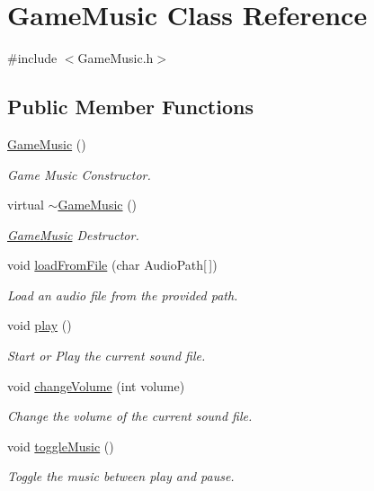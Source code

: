 \hypertarget{class_game_music}{}\section{Game\+Music Class Reference}
\label{class_game_music}


{\ttfamily \#include $<$Game\+Music.\+h$>$}

\subsection*{Public Member Functions}
\begin{DoxyCompactItemize}
\item 
\hyperlink{class_game_music_a3636a483e9a9d86ff5700f4a13662dcb}{Game\+Music} ()
\begin{DoxyCompactList}\small\item\em Game Music Constructor. \end{DoxyCompactList}\item 
virtual \hyperlink{class_game_music_a3ab16e5c895c854c7c1642e5718508f2}{$\sim$\+Game\+Music} ()
\begin{DoxyCompactList}\small\item\em \hyperlink{class_game_music}{Game\+Music} Destructor. \end{DoxyCompactList}\item 
void \hyperlink{class_game_music_a47a770430dc1213a4b31ab0353549018}{load\+From\+File} (char Audio\+Path\mbox{[}$\,$\mbox{]})
\begin{DoxyCompactList}\small\item\em Load an audio file from the provided path. \end{DoxyCompactList}\item 
void \hyperlink{class_game_music_a88151bbcf754b0dc87e75cf5949b7602}{play} ()
\begin{DoxyCompactList}\small\item\em Start or Play the current sound file. \end{DoxyCompactList}\item 
void \hyperlink{class_game_music_adafedd8d8c1b98efbac108c8f8b826ac}{change\+Volume} (int volume)
\begin{DoxyCompactList}\small\item\em Change the volume of the current sound file. \end{DoxyCompactList}\item 
void \hyperlink{class_game_music_ac14197e5734c1934ca85666c14a7a1c3}{toggle\+Music} ()
\begin{DoxyCompactList}\small\item\em Toggle the music between play and pause. \end{DoxyCompactList}\end{DoxyCompactItemize}
